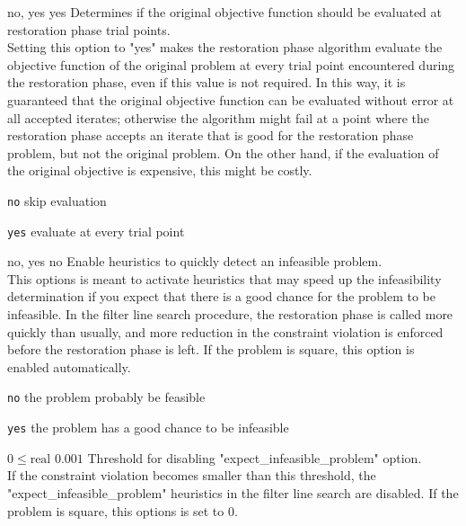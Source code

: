 %
{no, yes}%
{yes}%
{Determines if the original objective function should be evaluated at restoration phase trial points.\\
Setting this option to "yes" makes the restoration phase algorithm evaluate the objective function of the original problem at every trial point encountered during the restoration phase, even if this value is not required.  In this way, it is guaranteed that the original objective function can be evaluated without error at all accepted iterates; otherwise the algorithm might fail at a point where the restoration phase accepts an iterate that is good for the restoration phase problem, but not the original problem.  On the other hand, if the evaluation of the original objective is expensive, this might be costly.}%
{\begin{list}{}{
\setlength{\parsep}{0em}
\setlength{\leftmargin}{5ex}
\setlength{\labelwidth}{2ex}
\setlength{\itemindent}{0ex}
\setlength{\topsep}{0pt}}
\item[\texttt{no}] skip evaluation
\item[\texttt{yes}] evaluate at every trial point
\end{list}
}

%
{no, yes}%
{no}%
{Enable heuristics to quickly detect an infeasible problem.\\
This options is meant to activate heuristics that may speed up the infeasibility determination if you expect that there is a good chance for the problem to be infeasible.  In the filter line search procedure, the restoration phase is called more quickly than usually, and more reduction in the constraint violation is enforced before the restoration phase is left. If the problem is square, this option is enabled automatically.}%
{\begin{list}{}{
\setlength{\parsep}{0em}
\setlength{\leftmargin}{5ex}
\setlength{\labelwidth}{2ex}
\setlength{\itemindent}{0ex}
\setlength{\topsep}{0pt}}
\item[\texttt{no}] the problem probably be feasible
\item[\texttt{yes}] the problem has a good chance to be infeasible
\end{list}
}

%
{$0\leq\textrm{real}$}%
{$0.001$}%
{Threshold for disabling "expect\_infeasible\_problem" option.\\
If the constraint violation becomes smaller than this threshold, the "expect\_infeasible\_problem" heuristics in the filter line search are disabled. If the problem is square, this options is set to 0.}%
{}

